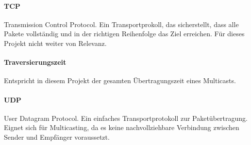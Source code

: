 \paragraph{TCP} Transmission Control Protocol. Ein Transportprokoll, das
sicherstellt, dass alle Pakete vollständig und in der richtigen Reihenfolge
das Ziel erreichen. Für dieses Projekt nicht weiter von Relevanz.

\paragraph{Traversierungszeit} Entspricht in diesem Projekt der gesamten Übertragungszeit eines Multicasts. \\

\paragraph{UDP} User Datagram Protocol. Ein einfaches Transportprotokoll zur
Paketübertragung. Eignet sich für Multicasting, da es keine nachvollziehbare
Verbindung zwischen Sender und Empfänger voraussetzt.